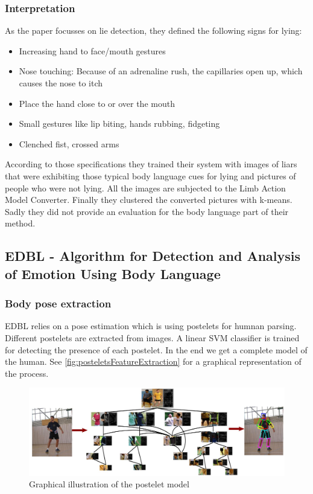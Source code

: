 \documentclass[conference]{IEEEtran}
\begin{document}
\subsubsection{Interpretation}
As the paper focusses on lie detection, they defined the following signs for lying\cite{kinsey2012,sorjoo,barathi2016lie}:
\begin{itemize}
\item{Increasing hand to face/mouth gestures}
\item{Nose touching: Because of an adrenaline rush, the capillaries open up, which causes the nose to itch}
\item{Place the hand close to or over the mouth}
\item{Small gestures like lip biting, hands rubbing, fidgeting}
\item{Clenched fist, crossed arms}
\end{itemize}
According to those specifications they trained their system with images of liars that were exhibiting those typical body language cues for lying and pictures of people who were not lying. All the images are subjected to the Limb Action Model Converter. Finally they clustered the converted pictures with k-means.
Sadly they did not provide an evaluation for the body language part of their method.

\subsection{EDBL - Algorithm for Detection and Analysis of Emotion Using Body Language }
\subsubsection{Body pose extraction}
EDBL\cite{singh2015edbl} relies on a pose estimation which is using postelets for humnan parsing\cite{wang2011learning}. Different postelets are extracted from images. A linear SVM classifier is trained for detecting the presence of each postelet. In the end we get a complete model of the human. See \autoref{fig:posteletsFeatureExtraction} for a graphical representation of the process.

\begin{figure}[H]
\centering
\includegraphics[width=\linewidth]{posteletsFeatureExtraction.jpg}
\caption{Graphical illustration of the postelet model\cite{wang2011learning}}
\label{fig:posteletsFeatureExtraction}
\end{figure}
\end{document}

